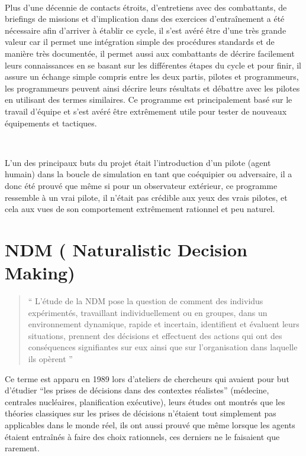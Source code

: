 ~\par
Plus d'une décennie de contacts étroits, d'entretiens avec des combattants, de briefings de missions et d'implication dans des exercices d'entraînement a été nécessaire afin d’arriver à établir ce cycle, il s’est avéré être d’une très grande valeur car il permet une intégration simple des procédures standards et de manière très documentée, il permet aussi aux combattants de décrire facilement leurs connaissances en se basant sur les différentes étapes du cycle et pour finir, il assure un échange simple compris entre les deux partis, pilotes et programmeurs, les programmeurs peuvent ainsi décrire leurs résultats et débattre avec les pilotes en utilisant des termes similaires. Ce programme est principalement  basé sur le travail d’équipe et s’est avéré être extrêmement utile pour tester de nouveaux équipements et tactiques.

~\par
L’un des principaux buts du projet était l’introduction d’un pilote (agent humain) dans la boucle de simulation en tant que coéquipier ou adversaire, il a donc été prouvé que même si pour un observateur extérieur, ce programme ressemble à un vrai pilote, il n’était pas crédible aux yeux des vrais pilotes, et cela aux vues de son comportement extrêmement rationnel et peu naturel. \parencite{norling2000enhancing}


\section{NDM ( Naturalistic Decision Making)}

\begin{quotation}
“ L’étude de la NDM  pose la question de comment des individus expérimentés, travaillant individuellement ou en groupes, dans un environnement dynamique, rapide et incertain, identifient et évaluent leurs situations, prennent des décisions et effectuent des actions qui ont des conséquences signifiantes sur eux ainsi que sur l'organisation dans laquelle ils opèrent ” \parencite{zsambok2014naturalistic} \end{quotation} 



Ce terme est apparu en 1989 lors d’ateliers de chercheurs qui avaient pour but d’étudier 
“les prises de décisions dans des contextes réalistes” (médecine, centrales nucléaires, planification exécutive), leurs études ont montrés que les théories classiques sur les prises de décisions n’étaient tout simplement pas applicables dans le monde réel, ils ont aussi prouvé que même lorsque les agents étaient entraînés à faire des choix rationnels, ces derniers ne le faisaient que rarement.

